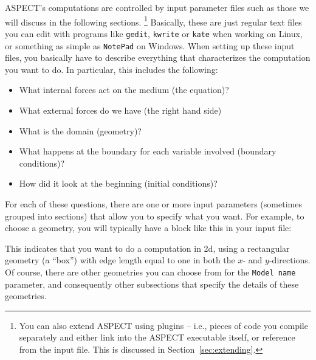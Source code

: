 \documentclass{article}
\newcommand{\aspect}{\textsc{ASPECT}}
\begin{document}
\aspect{}'s computations are controlled by input parameter files such as those
we will discuss in the following sections.%
\footnote{You can also extend \aspect{} using plugins -- i.e., pieces of code
you compile separately and either link into the \aspect{} executable itself, or
reference from the input file. This is discussed in
Section~\ref{sec:extending}.}
Basically, these are just regular text files you can edit with programs like
\texttt{gedit}, \texttt{kwrite} or \texttt{kate} when working on Linux, or
something as simple as \texttt{NotePad} on Windows. When setting up these input
files, you basically have to describe everything that characterizes the
computation you want to do. In particular, this includes the following:
\begin{itemize}
  \item What internal forces act on the medium (the equation)?
  \item What external forces do we have (the right hand side)
  \item What is the domain (geometry)?
  \item What happens at the boundary for each variable involved (boundary
 conditions)?
  \item How did it look at the beginning (initial conditions)?
\end{itemize}
For each of these questions, there are one or more input parameters (sometimes
grouped into sections) that allow you to specify what you want. For example, to
choose a geometry, you will typically have a block like this in your input file:
%

%
This indicates that you want to do a computation in 2d, using a rectangular
geometry (a ``box'') with edge length equal to one in both the $x$- and
$y$-directions. Of course, there are other geometries you can choose from for
the \texttt{Model name} parameter, and consequently other subsections that
specify the details of these geometries.
\end{document}
